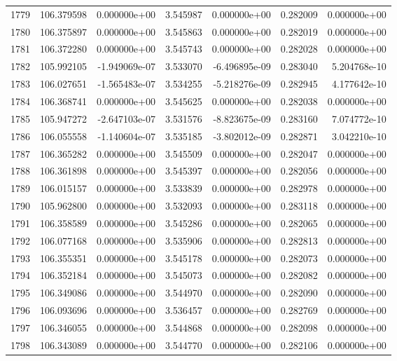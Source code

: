 \begin{tabular}{rrrrrrr}
1779 & 106.379598 &  0.000000e+00 &  3.545987 &  0.000000e+00 &    0.282009 &  0.000000e+00 \\
1780 & 106.375897 &  0.000000e+00 &  3.545863 &  0.000000e+00 &    0.282019 &  0.000000e+00 \\
1781 & 106.372280 &  0.000000e+00 &  3.545743 &  0.000000e+00 &    0.282028 &  0.000000e+00 \\
1782 & 105.992105 & -1.949069e-07 &  3.533070 & -6.496895e-09 &    0.283040 &  5.204768e-10 \\
1783 & 106.027651 & -1.565483e-07 &  3.534255 & -5.218276e-09 &    0.282945 &  4.177642e-10 \\
1784 & 106.368741 &  0.000000e+00 &  3.545625 &  0.000000e+00 &    0.282038 &  0.000000e+00 \\
1785 & 105.947272 & -2.647103e-07 &  3.531576 & -8.823675e-09 &    0.283160 &  7.074772e-10 \\
1786 & 106.055558 & -1.140604e-07 &  3.535185 & -3.802012e-09 &    0.282871 &  3.042210e-10 \\
1787 & 106.365282 &  0.000000e+00 &  3.545509 &  0.000000e+00 &    0.282047 &  0.000000e+00 \\
1788 & 106.361898 &  0.000000e+00 &  3.545397 &  0.000000e+00 &    0.282056 &  0.000000e+00 \\
1789 & 106.015157 &  0.000000e+00 &  3.533839 &  0.000000e+00 &    0.282978 &  0.000000e+00 \\
1790 & 105.962800 &  0.000000e+00 &  3.532093 &  0.000000e+00 &    0.283118 &  0.000000e+00 \\
1791 & 106.358589 &  0.000000e+00 &  3.545286 &  0.000000e+00 &    0.282065 &  0.000000e+00 \\
1792 & 106.077168 &  0.000000e+00 &  3.535906 &  0.000000e+00 &    0.282813 &  0.000000e+00 \\
1793 & 106.355351 &  0.000000e+00 &  3.545178 &  0.000000e+00 &    0.282073 &  0.000000e+00 \\
1794 & 106.352184 &  0.000000e+00 &  3.545073 &  0.000000e+00 &    0.282082 &  0.000000e+00 \\
1795 & 106.349086 &  0.000000e+00 &  3.544970 &  0.000000e+00 &    0.282090 &  0.000000e+00 \\
1796 & 106.093696 &  0.000000e+00 &  3.536457 &  0.000000e+00 &    0.282769 &  0.000000e+00 \\
1797 & 106.346055 &  0.000000e+00 &  3.544868 &  0.000000e+00 &    0.282098 &  0.000000e+00 \\
1798 & 106.343089 &  0.000000e+00 &  3.544770 &  0.000000e+00 &    0.282106 &  0.000000e+00 \\

\end{tabular}
